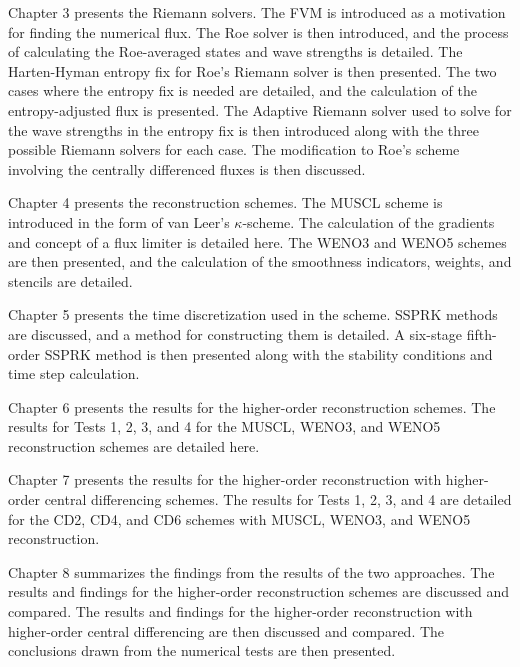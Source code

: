 Chapter 3 presents the Riemann solvers. The FVM is introduced as a motivation for finding the numerical flux. The Roe solver is then introduced, and the process of calculating the Roe-averaged states and wave strengths is detailed. The Harten-Hyman entropy fix for Roe's Riemann solver is then presented. The two cases where the entropy fix is needed are detailed, and the calculation of the entropy-adjusted flux is presented. The Adaptive Riemann solver used to solve for the wave strengths in the entropy fix is then introduced along with the three possible Riemann solvers for each case. The modification to Roe's scheme involving the centrally differenced fluxes is then discussed.

Chapter 4 presents the reconstruction schemes. The MUSCL scheme is introduced in the form of van Leer's \cite{VANLEER1977263} $\kappa$-scheme. The calculation of the gradients and concept of a flux limiter is detailed here. The WENO3 and WENO5 schemes are then presented, and the calculation of the smoothness indicators, weights, and stencils are detailed.

Chapter 5 presents the time discretization used in the scheme. SSPRK methods are discussed, and a method for constructing them is detailed. A six-stage fifth-order SSPRK method is then presented along with the stability conditions and time step calculation.

Chapter 6 presents the results for the higher-order reconstruction schemes. The results for Tests 1, 2, 3, and 4 for the MUSCL, WENO3, and WENO5 reconstruction schemes are detailed here.

Chapter 7 presents the results for the higher-order reconstruction with higher-order central differencing schemes. The results for Tests 1, 2, 3, and 4 are detailed for the CD2, CD4, and CD6 schemes with MUSCL, WENO3, and WENO5 reconstruction.

Chapter 8 summarizes the findings from the results of the two approaches. The results and findings for the higher-order reconstruction schemes are discussed and compared. The results and findings for the higher-order reconstruction with higher-order central differencing are then discussed and compared. The conclusions drawn from the numerical tests are then presented.